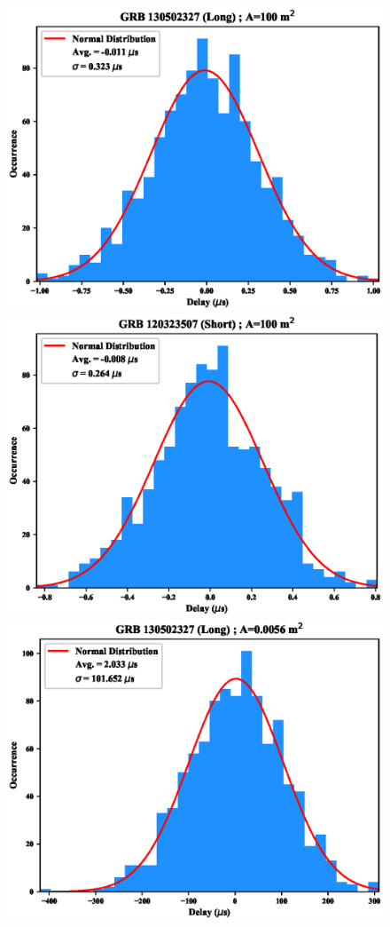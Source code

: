 \documentclass[]{spie}  %
\begin{document}
\begin{figure}[h!]
\centering
\includegraphics[scale=0.5,angle=0]{fig/distribution_long_100.eps}
\includegraphics[scale=0.5,angle=0]{fig/distribution_short_100.eps}\\
\includegraphics[scale=0.5,angle=0]{fig/distribution_long_56.eps}

\end{figure}
\end{document}

